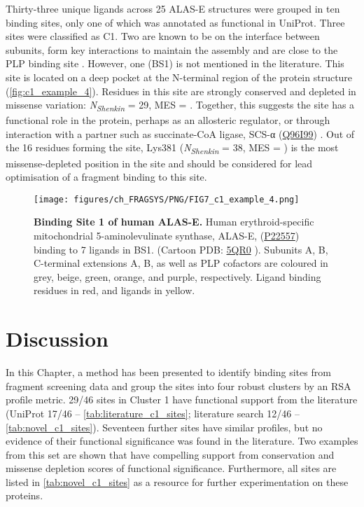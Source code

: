Thirty-three unique ligands across 25 ALAS-E structures were grouped in ten binding sites, only one of which was annotated as functional in UniProt. Three sites were classified as C1. Two are known to be on the interface between subunits, form key interactions to maintain the assembly and are close to the PLP binding site \cite{BAILEY_2020_AMINOLEVULINATE}. However, one (BS1) is not mentioned in the literature. This site is located on a deep pocket at the N-terminal region of the protein structure (\autoref{fig:c1_example_4}). Residues in this site are strongly conserved and depleted in missense variation: \textit{N\textsubscript{Shenkin}} = 29, MES = . Together, this suggests the site has a functional role in the protein, perhaps as an allosteric regulator, or through interaction with a partner such as succinate-CoA ligase, SCS-α (\href{https://www.uniprot.org/uniprotkb/Q96I99/entry}{Q96I99}) \cite{FURUYAMA_2000_SIDEROBLASTIC}. Out of the 16 residues forming the site, Lys381 (\textit{N\textsubscript{Shenkin}} = 38, MES = ) is the most missense-depleted position in the site and should be considered for lead optimisation of a fragment binding to this site.

\begin{figure}[htb!]
    \centering
    \texttt{[image: figures/ch\_FRAGSYS/PNG/FIG7\_c1\_example\_4.png]}
    \caption[Binding Site 1 of human ALAS-E]{\textbf{Binding Site 1 of human ALAS-E.} Human erythroid-specific mitochondrial 5-amino\-levulinate synthase, ALAS-E, (\href{https://www.uniprot.org/uniprotkb/P22557/entry}{P22557}) binding to 7 ligands in BS1. (Cartoon PDB: \href{https://www.ebi.ac.uk/pdbe/entry/pdb/5qr0}{5QR0} \cite{PDB_5QR0}). Subunits A, B, C-terminal extensions A, B, as well as PLP cofactors are coloured in grey, beige, green, orange, and purple, respectively. Ligand binding residues in red, and ligands in yellow.}
    \label{fig:c1_example_4}
\end{figure}

\vspace{-13pt} %

\section{Discussion}

In this Chapter, a method has been presented to identify binding sites from fragment screening data and group the sites into four robust clusters by an RSA profile metric. 29/46 sites in Cluster 1 have functional support from the literature (UniProt 17/46 -- \autoref{tab:literature_c1_sites}; literature search 12/46 -- \autoref{tab:novel_c1_sites}). Seventeen further sites have similar profiles, but no evidence of their functional significance was found in the literature. Two examples from this set are shown that have compelling support from conservation and missense depletion scores of functional significance. Furthermore, all sites are listed in \autoref{tab:novel_c1_sites} as a resource for further experimentation on these proteins.

